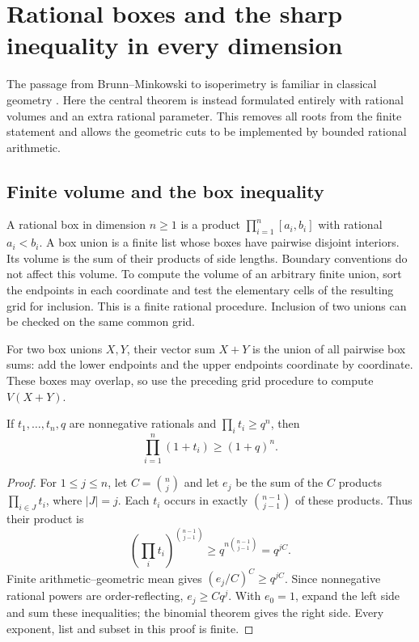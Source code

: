 \section{Rational boxes and the sharp inequality in every dimension}
\label{sec:euclidean}

The passage from Brunn--Minkowski to isoperimetry is familiar in classical
geometry \cite{Gardner2002}. Here the central theorem is instead formulated
entirely with rational volumes and an extra rational parameter. This removes
all roots from the finite statement and allows the geometric cuts to be
implemented by bounded rational arithmetic.

\subsection{Finite volume and the box inequality}

A rational box in dimension \(n\geq1\) is a product
\(\prod_{i=1}^n[a_i,b_i]\) with rational \(a_i<b_i\). A box union is
a finite list whose boxes have pairwise disjoint interiors. Its volume
is the sum of their products of side lengths. Boundary conventions do not
affect this volume. To compute the volume of an arbitrary finite union,
sort the endpoints in each coordinate and test the elementary cells of
the resulting grid for inclusion. This is a finite rational procedure.
Inclusion of two unions can be checked on the same common grid.

For two box unions \(X,Y\), their vector sum \(X+Y\) is the union of
all pairwise box sums: add the lower endpoints and the upper endpoints
coordinate by coordinate. These boxes may overlap, so use the preceding
grid procedure to compute \(V(X+Y)\).

\begin{lemma}\label{lem:box-product}
If \(t_1,\ldots,t_n,q\) are nonnegative rationals and
\(\prod_i t_i\geq q^n\), then
\[
 \prod_{i=1}^n(1+t_i)\geq(1+q)^n.
\]
\end{lemma}
\begin{proof}
For \(1\leq j\leq n\), let \(C=\binom nj\) and let \(e_j\)
be the sum of the \(C\) products \(\prod_{i\in J}t_i\), where
\(|J|=j\). Each \(t_i\) occurs in exactly
\(\binom{n-1}{j-1}\) of these products. Thus their product is
\[
 \left(\prod_i t_i\right)^{\binom{n-1}{j-1}}
 \geq q^{n\binom{n-1}{j-1}}=q^{jC}.
\]
Finite arithmetic--geometric mean gives
\((e_j/C)^C\geq q^{jC}\). Since nonnegative rational powers are
order-reflecting, \(e_j\geq Cq^j\). With \(e_0=1\), expand the
left side and sum these inequalities; the binomial theorem gives the
right side. Every exponent, list and subset in this proof is finite.
\end{proof}


